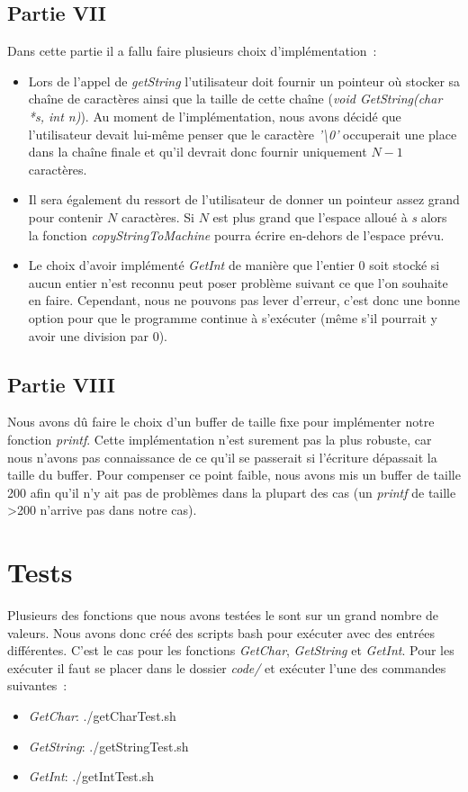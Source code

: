 \documentclass{article}
\begin{document}
\subsection{Partie VII}
Dans cette partie il a fallu faire plusieurs choix d'implémentation :
\begin{itemize}
    \item Lors de l'appel de \textit{getString} l'utilisateur doit fournir un pointeur où
          stocker sa chaîne de caractères ainsi que la taille de cette chaîne \linebreak
          (\textit{void GetString(char *s, int n)}). Au moment de l'implémentation, nous
          avons décidé que l'utilisateur devait lui-même penser que le caractère
          \textit{'\textbackslash0'} occuperait une place dans la chaîne finale et qu'il
          devrait donc fournir uniquement $N-1$ caractères.
    \item Il sera également du ressort de l'utilisateur de donner un pointeur assez grand
          pour contenir $N$ caractères. Si $N$ est plus grand que l'espace alloué à
          \textit{s} alors la fonction \textit{copyStringToMachine} pourra écrire
          en-dehors de l'espace prévu.
    \item Le choix d'avoir implémenté \textit{GetInt} de manière que l'entier 0 soit stocké
    si aucun entier n'est reconnu peut poser problème suivant ce que l'on souhaite en faire. Cependant,
    nous ne pouvons pas lever d'erreur, c'est donc une bonne option pour que le programme continue à s'exécuter
    (même s'il pourrait y avoir une division par 0).
\end{itemize}

\subsection{Partie VIII} 
Nous avons dû faire le choix d'un buffer de taille fixe pour implémenter notre fonction \textit{printf}. Cette implémentation
n'est surement pas la plus robuste, car nous n'avons pas connaissance de ce qu'il se passerait si l'écriture dépassait la taille 
du buffer. Pour compenser ce point faible, nous avons mis un buffer de taille 200 afin qu'il n'y ait pas de problèmes dans la plupart
des cas (un \textit{printf} de taille \textgreater200 n'arrive pas dans notre cas).
\section{Tests}
Plusieurs des fonctions que nous avons testées le sont sur un grand nombre de valeurs.
Nous avons donc créé des scripts bash pour exécuter avec des entrées différentes.
C'est le cas pour les fonctions \textit{GetChar}, \textit{GetString} et \textit{GetInt}.
Pour les exécuter il faut se placer dans le dossier \textit{code/} et exécuter l'une 
des commandes suivantes :
\begin{itemize}
    \item \textit{GetChar}: ./getCharTest.sh
    \item \textit{GetString}: ./getStringTest.sh
    \item \textit{GetInt}: ./getIntTest.sh
\end{itemize}
\end{document}
